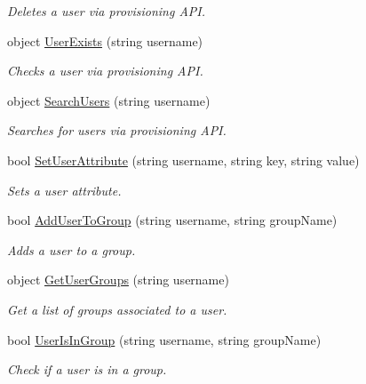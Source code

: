 \begin{DoxyCompactItemize}
\begin{DoxyCompactList}\small\item\em Deletes a user via provisioning A\+P\+I. \end{DoxyCompactList}\item 
object \hyperlink{classowncloudsharp_1_1_client_ac5c4564d7ef95b6fe8aa912f447e1644}{User\+Exists} (string username)
\begin{DoxyCompactList}\small\item\em Checks a user via provisioning A\+P\+I. \end{DoxyCompactList}\item 
object \hyperlink{classowncloudsharp_1_1_client_aa324d53147f5952788d983201fc7fcb7}{Search\+Users} (string username)
\begin{DoxyCompactList}\small\item\em Searches for users via provisioning A\+P\+I. \end{DoxyCompactList}\item 
bool \hyperlink{classowncloudsharp_1_1_client_a788f66e2d774a7c47e0a46918a50c5b5}{Set\+User\+Attribute} (string username, string key, string value)
\begin{DoxyCompactList}\small\item\em Sets a user attribute. \end{DoxyCompactList}\item 
bool \hyperlink{classowncloudsharp_1_1_client_a7b8657d971f2b1a9f27f2b8cfc73a21b}{Add\+User\+To\+Group} (string username, string group\+Name)
\begin{DoxyCompactList}\small\item\em Adds a user to a group. \end{DoxyCompactList}\item 
object \hyperlink{classowncloudsharp_1_1_client_a0ab2a296d77fa4def48b46a8d7b99da2}{Get\+User\+Groups} (string username)
\begin{DoxyCompactList}\small\item\em Get a list of groups associated to a user. \end{DoxyCompactList}\item 
bool \hyperlink{classowncloudsharp_1_1_client_a4c82896a96502650ab217cbf55342157}{User\+Is\+In\+Group} (string username, string group\+Name)
\begin{DoxyCompactList}\small\item\em Check if a user is in a group. \end{DoxyCompactList}\item 

\end{DoxyCompactItemize}
